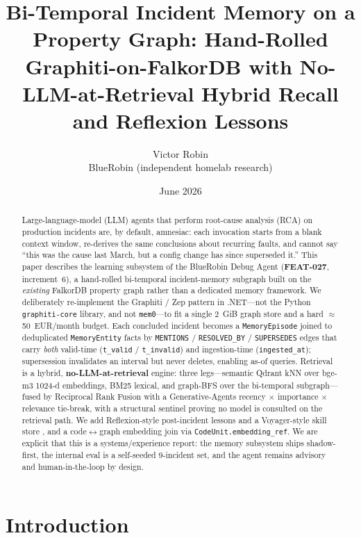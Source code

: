 \documentclass[11pt]{article}
\title{Bi-Temporal Incident Memory on a Property Graph:
Hand-Rolled Graphiti-on-FalkorDB with No-LLM-at-Retrieval
Hybrid Recall and Reflexion Lessons}
\author{Victor Robin\\ BlueRobin (independent homelab research)}
\date{June 2026}
\begin{document}
\maketitle

\begin{abstract}
Large-language-model (LLM) agents that perform root-cause analysis (RCA) on
production incidents are, by default, amnesiac: each invocation starts from a
blank context window, re-derives the same conclusions about recurring faults,
and cannot say ``this was the cause last March, but a config change has since
superseded it.'' This paper describes the learning subsystem of the BlueRobin
Debug Agent (\textbf{FEAT-027}, increment~6), a hand-rolled bi-temporal
incident-memory subgraph built on the \emph{existing} FalkorDB property graph
rather than a dedicated memory framework. We deliberately re-implement the
Graphiti / Zep pattern \citep{rasmussen2025zep} in .NET---not the Python
\texttt{graphiti-core} library, and not \texttt{mem0}---to fit a single 2~GiB
graph store and a hard $\approx$50~EUR/month budget. Each concluded incident
becomes a \texttt{MemoryEpisode} joined to deduplicated \texttt{MemoryEntity}
facts by \texttt{MENTIONS} / \texttt{RESOLVED\_BY} / \texttt{SUPERSEDES} edges
that carry \emph{both} valid-time (\texttt{t\_valid} / \texttt{t\_invalid}) and
ingestion-time (\texttt{ingested\_at}); supersession invalidates an interval but
never deletes, enabling as-of queries. Retrieval is a hybrid,
\textbf{no-LLM-at-retrieval} engine: three legs---semantic Qdrant kNN over
bge-m3 1024-d embeddings, BM25 lexical, and graph-BFS over the bi-temporal
subgraph---fused by Reciprocal Rank Fusion \citep{cormack2009rrf} with a
Generative-Agents \citep{park2023generative} recency $\times$ importance $\times$
relevance tie-break, with a structural sentinel proving no model is consulted on
the retrieval path. We add Reflexion-style post-incident lessons
\citep{shinn2023reflexion} and a Voyager-style skill store
\citep{wang2023voyager}, and a code$\leftrightarrow$graph embedding join via
\texttt{CodeUnit.embedding\_ref}. We are explicit that this is a
systems/experience report: the memory subsystem ships shadow-first, the internal
eval is a self-seeded 9-incident set, and the agent remains advisory and
human-in-the-loop by design.
\end{abstract}

\section{Introduction}
\end{document}
